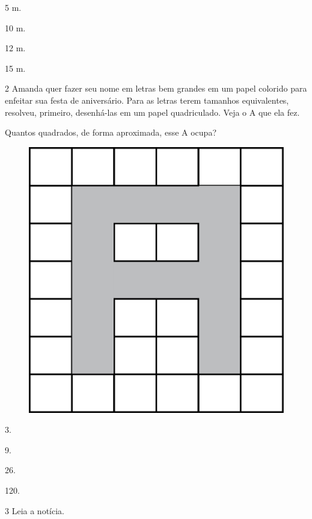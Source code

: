 \begin{escolha}
\item
  5 m.
\item
  10 m.
\item
  12 m.
\item
  15 m.
\end{escolha}

\pagebreak

\num{2} Amanda quer fazer seu nome em letras bem grandes em um papel colorido para enfeitar sua festa de aniversário. Para as letras terem tamanhos equivalentes, resolveu, primeiro, desenhá-las em um papel quadriculado. Veja o A que ela fez.

Quantos quadrados, de forma aproximada, esse A ocupa?

\begin{figure}[htpb!]
\centering
\includegraphics[width=.8\textwidth]{./media/image62.png}
\end{figure}

\begin{escolha}
\item
  3.
\item
  9.
\item
  26.
\item
  120.
\end{escolha}

\pagebreak
\num{3} Leia a notícia.

